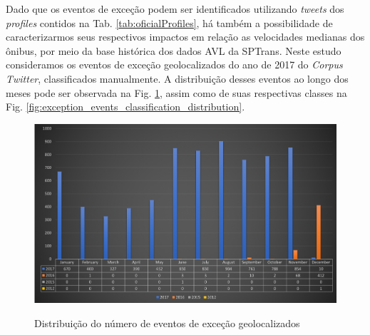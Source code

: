\documentclass[
	12pt,				%
	oneside,			%
	a4paper,			%
	english,			%
	brazil				%
	]{abntex2ppgsi}
\begin{document}
{{Dado que os eventos de exceção podem ser identificados utilizando \textit{tweets} dos \textit{profiles} contidos na Tab. \ref{tab:oficialProfiles}, há também a possibilidade de caracterizarmos seus respectivos impactos em relação as velocidades medianas dos ônibus, por meio da base histórica dos dados AVL da SPTrans.  Neste estudo consideramos os eventos de exceção geolocalizados do ano de 2017 do \textit{Corpus Twitter}, classificados manualmente. A distribuição desses eventos ao longo dos meses pode ser observada  na Fig. \ref{fig:geolocated_exception_events_distribution}, assim como de suas respectivas classes na Fig. \ref{fig:exception_events_classification_distribution}.



\begin{figure}[!htb]
	\centering
 	  \caption{Distribuição do número de eventos de exceção geolocalizados}
		\includegraphics[width=1\linewidth]{images/geolocated_exception_events_distribution.png}
	\label{fig:geolocated_exception_events_distribution}
\end{figure}

}}
\end{document}
